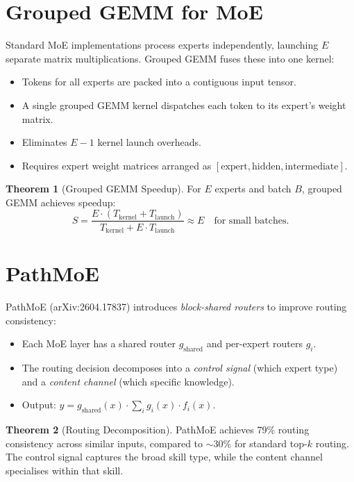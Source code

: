 \documentclass[11pt,a4paper]{book}
\theoremstyle{definition}
\newtheorem{theorem}{Theorem}[chapter]
\begin{document}
\section{Grouped GEMM for MoE}

Standard MoE implementations process experts independently, launching $E$ separate matrix multiplications. Grouped GEMM fuses these into one kernel:

\begin{itemize}
	\item Tokens for all experts are packed into a contiguous input tensor.
	\item A single grouped GEMM kernel dispatches each token to its expert's weight matrix.
	\item Eliminates $E-1$ kernel launch overheads.
	\item Requires expert weight matrices arranged as $[\text{expert}, \text{hidden}, \text{intermediate}]$.
\end{itemize}

\begin{theorem}[Grouped GEMM Speedup]
	For $E$ experts and batch $B$, grouped GEMM achieves speedup:
	\begin{equation}
		S = \frac{E \cdot (T_{\text{kernel}} + T_{\text{launch}})}{T_{\text{kernel}} + E \cdot T_{\text{launch}}} \approx E \quad \text{for small batches}.
	\end{equation}
\end{theorem}

\section{PathMoE}

PathMoE (arXiv:2604.17837) introduces \emph{block-shared routers} to improve routing consistency:

\begin{itemize}
	\item Each MoE layer has a shared router $g_{\text{shared}}$ and per-expert routers $g_i$.
	\item The routing decision decomposes into a \emph{control signal} (which expert type) and a \emph{content channel} (which specific knowledge).
	\item Output: $y = g_{\text{shared}}(x) \cdot \sum_i g_i(x) \cdot f_i(x)$.
\end{itemize}

\begin{theorem}[Routing Decomposition]
	PathMoE achieves 79\% routing consistency across similar inputs, compared to $\sim 30\%$ for standard top-$k$ routing. The control signal captures the broad skill type, while the content channel specialises within that skill.
\end{theorem}
\end{document}
